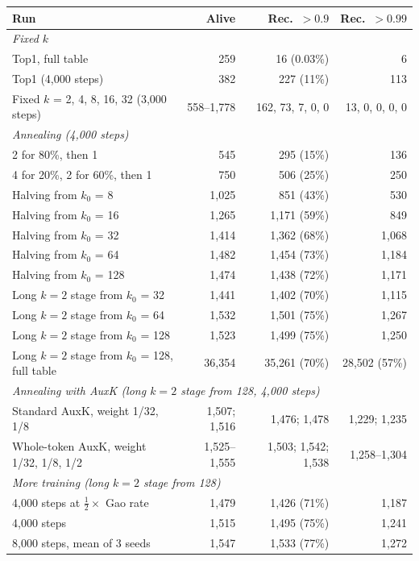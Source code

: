 \documentclass[11pt]{article}
\begin{document}
\begin{table}[h]
\centering
\small
\begin{tabular}{@{}p{7.2cm}rrr@{}}
\toprule
Run & Alive & Rec.\ $>0.9$ & Rec.\ $>0.99$ \\
\midrule
\multicolumn{4}{l}{\emph{Fixed $k$}} \\
Top1, full table & 259 & 16 (0.03\%) & 6 \\
Top1 (4,000 steps) & 382 & 227 (11\%) & 113 \\
Fixed $k$ = 2, 4, 8, 16, 32 (3,000 steps) & 558--1,778 & 162, 73, 7, 0, 0 & 13, 0, 0, 0, 0 \\
\midrule
\multicolumn{4}{l}{\emph{Annealing (4,000 steps)}} \\
2 for 80\%, then 1 & 545 & 295 (15\%) & 136 \\
4 for 20\%, 2 for 60\%, then 1 & 750 & 506 (25\%) & 250 \\
Halving from $k_0$ = 8 & 1,025 & 851 (43\%) & 530 \\
Halving from $k_0$ = 16 & 1,265 & 1,171 (59\%) & 849 \\
Halving from $k_0$ = 32 & 1,414 & 1,362 (68\%) & 1,068 \\
Halving from $k_0$ = 64 & 1,482 & 1,454 (73\%) & 1,184 \\
Halving from $k_0$ = 128 & 1,474 & 1,438 (72\%) & 1,171 \\
Long $k = 2$ stage from $k_0$ = 32 & 1,441 & 1,402 (70\%) & 1,115 \\
Long $k = 2$ stage from $k_0$ = 64 & 1,532 & 1,501 (75\%) & 1,267 \\
Long $k = 2$ stage from $k_0$ = 128 & 1,523 & 1,499 (75\%) & 1,250 \\
Long $k = 2$ stage from $k_0$ = 128, full table & 36,354 & 35,261 (70\%) & 28,502 (57\%) \\
\midrule
\multicolumn{4}{l}{\emph{Annealing with AuxK (long $k = 2$ stage from 128, 4,000 steps)}} \\
Standard AuxK, weight 1/32, 1/8 & 1,507; 1,516 & 1,476; 1,478 & 1,229; 1,235 \\
Whole-token AuxK, weight 1/32, 1/8, 1/2 & 1,525--1,555 & 1,503; 1,542; 1,538 & 1,258--1,304 \\
\midrule
\multicolumn{4}{l}{\emph{More training (long $k = 2$ stage from 128)}} \\
4,000 steps at $\tfrac12\times$ Gao rate & 1,479 & 1,426 (71\%) & 1,187 \\
4,000 steps & 1,515 & 1,495 (75\%) & 1,241 \\
8,000 steps, mean of 3 seeds & 1,547 & 1,533 (77\%) & 1,272 \\

\end{tabular}
\end{table}
\end{document}
